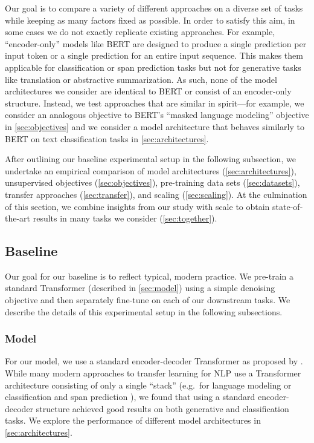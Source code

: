 \documentclass[twoside,11pt]{article}
\begin{document}
Our goal is to compare a variety of different approaches on a diverse set of tasks while keeping as many factors fixed as possible.
In order to satisfy this aim, in some cases we do not exactly replicate existing approaches.
For example, ``encoder-only'' models like BERT \citep{devlin2018bert} are designed to produce a single prediction per input token or a single prediction for an entire input sequence.
This makes them applicable for classification or span prediction tasks but not for generative tasks like translation or abstractive summarization.
As such, none of the model architectures we consider are identical to BERT or consist of an encoder-only structure.
Instead, we test approaches that are similar in spirit---for example, we consider an analogous objective to BERT's ``masked language modeling'' objective in \cref{sec:objectives} and we consider a model architecture that behaves similarly to BERT on text classification tasks in \cref{sec:architectures}.

After outlining our baseline experimental setup in the following subsection, we undertake an empirical comparison of model architectures (\cref{sec:architectures}), unsupervised objectives (\cref{sec:objectives}), pre-training data sets (\cref{sec:datasets}), transfer approaches (\cref{sec:transfer}), and scaling (\cref{sec:scaling}).
At the culmination of this section, we combine insights from our study with scale to obtain state-of-the-art results in many tasks we consider (\cref{sec:together}).

\subsection{Baseline}
\label{sec:baseline}

Our goal for our baseline is to reflect typical, modern practice.
We pre-train a standard Transformer (described in \cref{sec:model}) using a simple denoising objective and then separately fine-tune on each of our downstream tasks.
We describe the details of this experimental setup in the following subsections.

\subsubsection{Model}
\label{sec:model_hparams}

For our model, we use a standard encoder-decoder Transformer as proposed by \cite{vaswani2017attention}.
While many modern approaches to transfer learning for NLP use a Transformer architecture consisting of only a single ``stack'' (e.g.\ for language modeling \citep{radford2018improving,dong2019unified} or classification and span prediction \citep{devlin2018bert,yang2019xlnet}), we found that using a standard encoder-decoder structure achieved good results on both generative and classification tasks.
We explore the performance of different model architectures in \cref{sec:architectures}.
\end{document}
